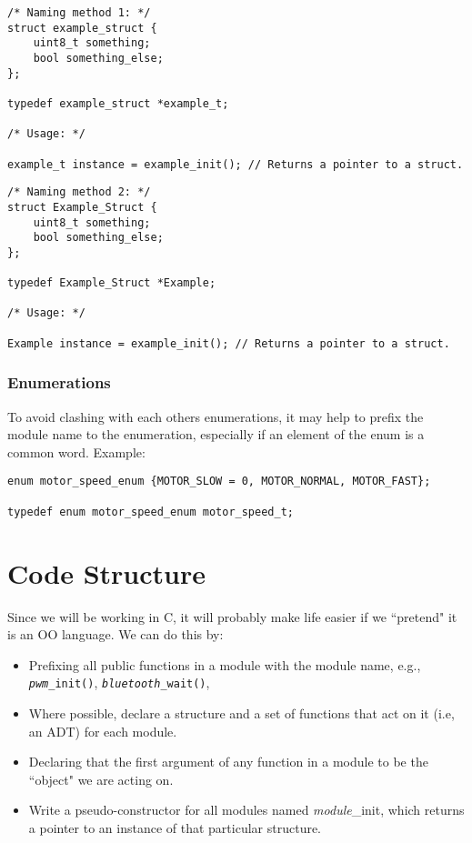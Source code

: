 \documentclass[10pt]{article}
\begin{document}
\begin{lstlisting}[frame=single]
/* Naming method 1: */
struct example_struct {
	uint8_t something;
	bool something_else;
};

typedef example_struct *example_t;

/* Usage: */

example_t instance = example_init(); // Returns a pointer to a struct.

\end{lstlisting}
\begin{lstlisting}[frame=single]
/* Naming method 2: */
struct Example_Struct {
	uint8_t something;
	bool something_else;
};

typedef Example_Struct *Example;

/* Usage: */

Example instance = example_init(); // Returns a pointer to a struct.
\end{lstlisting}

\subsubsection{Enumerations}
To avoid clashing with each others enumerations, it may help to prefix the module name to the enumeration, especially if an element of the enum is a common word. Example:
\begin{lstlisting}[frame=single]
enum motor_speed_enum {MOTOR_SLOW = 0, MOTOR_NORMAL, MOTOR_FAST};

typedef enum motor_speed_enum motor_speed_t;
\end{lstlisting}
\section{Code Structure}
Since we will be working in C, it will probably make life easier if we ``pretend" it is an OO language. We can do this by:
\begin{itemize}
  \item Prefixing all public functions in a module with the module name, e.g., \texttt{\emph{pwm}\_init()}, \texttt{\emph{bluetooth}\_wait()}, 
  \item Where possible, declare a structure and a set of functions that act on it (i.e, an ADT) for each module.
  \item Declaring that the first argument of any function in a module to be the ``object" we are acting on.
  \item Write a pseudo-constructor for all modules named \emph{module}\_init, which returns a pointer to an instance of that particular structure.
\end{itemize}
\end{document}
